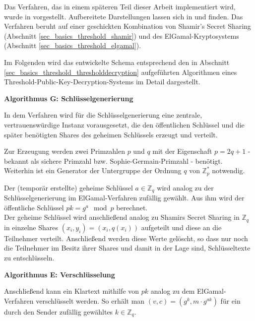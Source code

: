 

Das Verfahren, das in einem späteren Teil dieser Arbeit implementiert wird, wurde in \cite{DesmedtFrankel1990} vorgestellt. Aufbereitete Darstellungen lassen sich in \cite{katz2014} und \cite{boneh2016} finden. Das Verfahren beruht auf einer geschickten Kombination von Shamir's Secret Sharing (Abschnitt \ref{sec_basics_threshold_shamir}) und des ElGamal-Kryptosystems (Abschnitt \ref{sec_basics_threshold_elgamal}).

Im Folgenden wird das entwickelte Schema entsprechend den in Abschnitt \ref{sec_basics_threshold_thresholddecryption} aufgeführten Algorithmen eines Threshold-Public-Key-Decryption-Systems im Detail dargestellt.

\textbf{Algorithmus G: Schlüsselgenerierung}

In dem Verfahren wird für die Schlüsselgenerierung eine zentrale, vertrauenswürdige Instanz vorausgesetzt, die den öffentlichen Schlüssel und die später benötigten Shares des geheimen Schlüssels erzeugt und verteilt. 

Zur Erzeugung werden zwei Primzahlen \(p\) und \(q\) mit der Eigenschaft \(p = 2q + 1\) - bekannt als sichere Primzahl bzw. Sophie-Germain-Primzahl - benötigt. Weiterhin ist ein Generator der Untergruppe der Ordnung \(q\) von \(\mathbb{Z}_p^*\) notwendig.

Der (temporär erstellte) geheime Schlüssel \(a \in \mathbb{Z}_q\) wird analog zu der Schlüsselgenerierung im ElGamal-Verfahren zufällig gewählt. Aus ihm wird der öffentliche Schlüssel \(pk = g^a \mod p\) berechnet.\\
Der geheime Schlüssel wird anschließend analog zu Shamirs Secret Sharing in \(\mathbb{Z}_q\) in einzelne Shares \((x_i, y_i) = (x_i, q(x_i))\) aufgeteilt und diese an die Teilnehmer verteilt. Anschließend werden diese Werte gelöscht, so dass nur noch die Teilnehmer im Besitz ihrer Shares und damit in der Lage sind, Schlüsseltexte zu entschlüsseln.

\textbf{Algorithmus E: Verschlüsselung}

Anschließend kann ein Klartext mithilfe von \(pk\) analog zu dem ElGamal-Verfahren 
verschlüsselt werden. So erhält man \((v,c) = (g^k, m \cdot g^{ak})\) für ein durch den Sender zufällig gewähltes \(k \in \mathbb{Z}_q\).

